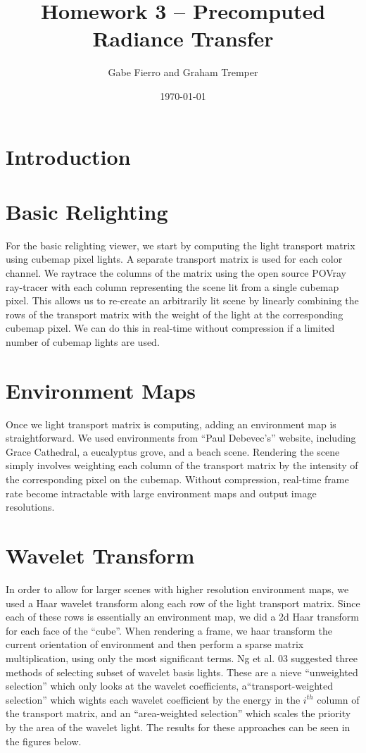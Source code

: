 \documentclass[11pt]{article}
\begin{document}
\title{Homework 3 -- Precomputed Radiance Transfer}
\author{Gabe Fierro and Graham Tremper}
\date{\today}
\maketitle

\section{Introduction}

\section{Basic Relighting}
For the basic relighting viewer, we start by computing the light transport matrix using cubemap pixel lights. A separate transport matrix is used for each color channel. We raytrace the columns of the matrix using the open source POVray ray-tracer with each column representing the scene lit from a single cubemap pixel. This allows us to re-create an arbitrarily lit scene by linearly combining the rows of the transport matrix with the weight of the light at the corresponding cubemap pixel. We can do this in real-time without compression if a limited number of cubemap lights are used.

\section{Environment Maps}
Once we light transport matrix is computing, adding an environment map is straightforward. We used environments from ``Paul Debevec's'' website, including Grace Cathedral, a eucalyptus grove, and a beach scene. Rendering the scene simply involves weighting each column of the transport matrix by the intensity of the corresponding pixel on the cubemap. Without compression, real-time frame rate become intractable with large environment maps and output image resolutions.

\section{Wavelet Transform}
In order to allow for larger scenes with higher resolution environment maps, we used a Haar wavelet transform along each row of the light transport matrix. Since each of these rows is essentially an environment map, we did a 2d Haar transform for each face of the ``cube''. When rendering a frame, we haar transform the current orientation of environment and then perform a sparse matrix multiplication, using only the most significant terms. Ng et al. 03 suggested three methods of selecting subset of wavelet basis lights. These are a nieve ``unweighted selection'' which only looks at the wavelet coefficients, a``transport-weighted selection'' which wights each wavelet coefficient by the energy in the $i^{th}$ column of the transport matrix, and an ``area-weighted selection'' which scales the priority by the area of the wavelet light. The results for these approaches can be seen in the figures below.
\end{document}

